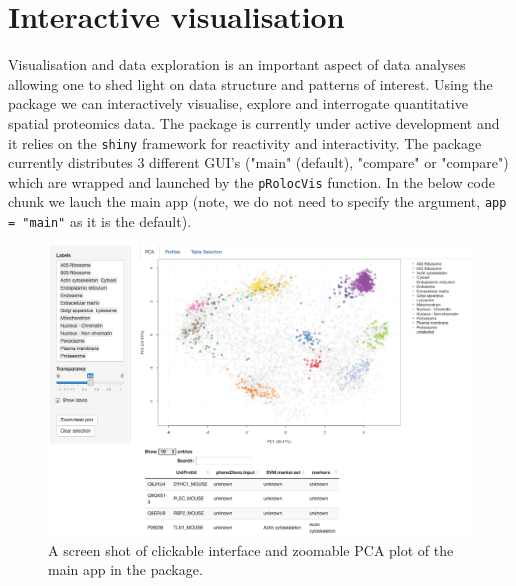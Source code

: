 \section*{Interactive visualisation}

Visualisation and data exploration is an important aspect of data
analyses allowing one to shed light on data structure and patterns of
interest. Using the  package we can
interactively visualise, explore and interrogate quantitative spatial
proteomics data. The  package is currently
under active development and it relies on the \texttt{shiny} framework for
reactivity and interactivity. The package currently distributes 3
different GUI's ("main" (default), "compare" or "compare") which are
wrapped and launched by the \texttt{pRolocVis} function. In the below code
chunk we lauch the main app (note, we do not need to specify the
argument, \texttt{app = "main"} as it is the default).

\begin{knitrout}
\color{fgcolor}\begin{kframe}
\begin{alltt}
\hlstd{(}\hlstd{)}
\end{alltt}
\end{kframe}
\end{knitrout}

\begin{figure}[!ht]
  \centering
  \includegraphics[width=\textwidth]{./Figures/mainapp.png}
  \caption{A screen shot of clickable interface and zoomable PCA plot of the main app in the  package.}
  \label{fig:app}
\end{figure}

